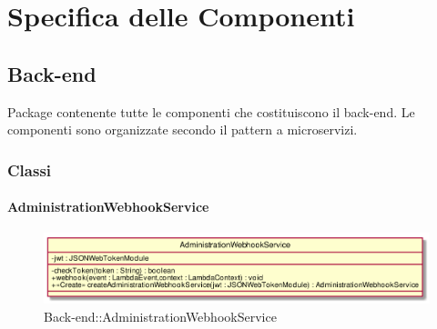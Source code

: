 \section{Specifica delle Componenti}
\subsection{Back-end}
Package contenente tutte le componenti che costituiscono il back-end. Le componenti sono organizzate secondo il pattern a microservizi.
\subsubsection{Classi}
\hypertarget{AdministrationWebhookService_label}{\paragraph{AdministrationWebhookService}}
\begin{figure}[h]
	\centering
	\includegraphics[width=\textwidth,height=\textheight,keepaspectratio]{images/ClassAdministrationWebhookService.png}
	\caption{Back-end::AdministrationWebhookService}
\end{figure}
